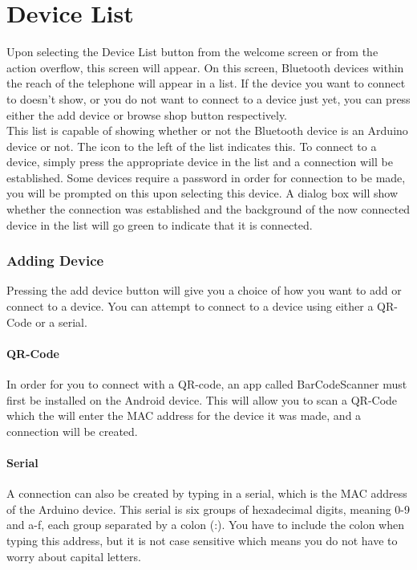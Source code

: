 \chapter{Device List}
Upon selecting the Device List button from the welcome screen or from the action overflow, this screen will appear. On this screen, Bluetooth devices within the reach of the telephone will appear in a list. If the device you want to connect to doesn't show, or you do not want to connect to a device just yet, you can press either the add device or browse shop button respectively.\\
\newline
This list is capable of showing whether or not the Bluetooth device is an Arduino device or not. The icon to the left of the list indicates this.
To connect to a device, simply press the appropriate device in the list and a connection will be established. Some devices require a password in order for connection to be made, you will be prompted on this upon selecting this device. A dialog box will show whether the connection was established and the background of the now connected device in the list will go green to indicate that it is connected. \\
\newline


\subsection{Adding Device}
Pressing the add device button will give you a choice of how you want to add or connect to a device. You can attempt to connect to a device using either a QR-Code or a serial.

\subsubsection{QR-Code}
In order for you to connect with a QR-code, an app called BarCodeScanner must first be installed on the Android device. This will allow you to scan a QR-Code which the will enter the MAC address for the device it was made, and a connection will be created.\\

\subsubsection{Serial}
A connection can also be created by typing in a serial, which is the MAC address of the Arduino device. This serial is six groups of hexadecimal digits, meaning 0-9 and a-f, each group separated by a colon (:). You have to include the colon when typing this address, but it is not case sensitive which means you do not have to worry about capital letters.\\

